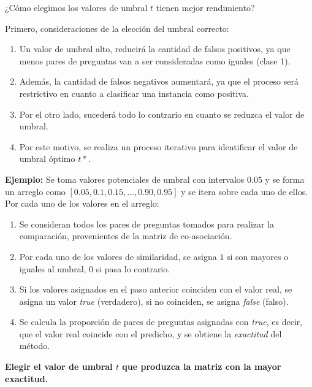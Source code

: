 \begin{frame}[allowframebreaks]
	\begin{center}
		\centering	¿Cómo elegimos los valores de umbral \(t\) tienen mejor rendimiento?
	\end{center}

	\framebreak

	Primero, consideraciones de la elección del umbral correcto:
	\bigskip
	\begin{enumerate}[<*>]
		\item Un valor de umbral alto, reducirá la cantidad de falsos positivos, ya que menos pares de preguntas van a ser consideradas como iguales (clase 1).
		\item Además, la cantidad de falsos negativos aumentará, ya que el proceso será restrictivo en cuanto a clasificar una instancia como positiva.
		\item Por el otro lado, sucederá todo lo contrario en cuanto se reduzca el valor de umbral.
		\item Por este motivo, se realiza un proceso iterativo para identificar el valor de umbral óptimo \(t*\).
	\end{enumerate}

	\framebreak

	\textbf{Ejemplo:} Se toma valores potenciales de umbral con intervalos \(0.05\) y se forma un arreglo como \textbf{\([0.05, 0.1, 0.15, ..., 0.90, 0.95]\)} y se itera sobre cada uno de ellos. Por cada uno de los valores en el arreglo:
	\bigskip
	\begin{enumerate}[<*>]
		\item Se consideran todos los pares de preguntas tomados para realizar la comparación, provenientes de la matriz de co-asociación.
		\item Por cada uno de los valores de similaridad, se asigna \(1\) si son mayores o iguales al umbral, \(0\) si pasa lo contrario.
		\item Si los valores asignados en el paso anterior coinciden con el valor real, se asigna un valor \textit{true} (verdadero), si no coinciden, se asigna \textit{false} (falso).
		\item Se calcula la proporción de pares de preguntas asignadas con \textit{true}, es decir, que el valor real coincide con el predicho, y se obtiene la \textit{exactitud} del método.
	\end{enumerate}

	\begin{center}
		\textbf{Elegir el valor de umbral \(t\) que produzca la matriz con la mayor exactitud.}
	\end{center}


\end{frame}
